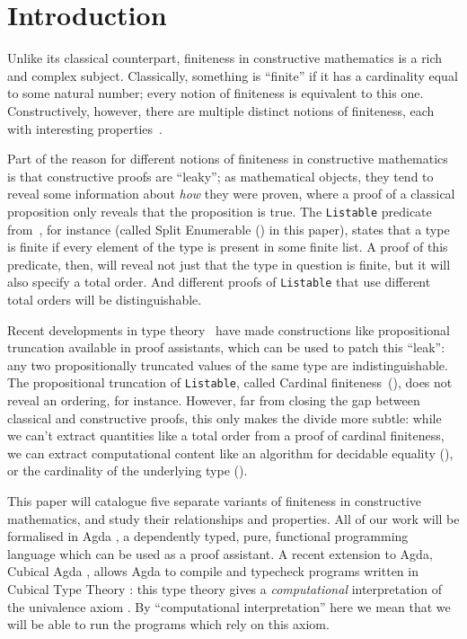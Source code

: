 \section{Introduction}
Unlike its classical counterpart, finiteness in constructive mathematics is a
rich and complex subject.
Classically, something is ``finite'' if it has a cardinality equal to some
natural number; every notion of finiteness is equivalent to this one.
Constructively, however, there are multiple distinct notions of finiteness, each
with interesting properties~\cite{coquandConstructivelyFinite2010,
  firsovVariationsNoetherianness2016, fruminFiniteSetsHomotopy2018}.

Part of the reason for different notions of finiteness in constructive
mathematics is that constructive proofs are ``leaky''; as mathematical
objects, they tend to reveal some information about \emph{how} they were proven,
where a proof of a classical proposition only reveals that the proposition is
true.
The \verb+Listable+ predicate
from~\citet{firsovDependentlyTypedProgramming2015}, for instance (called Split
Enumerable () in this paper),
states that a type is finite if every element of the type is present in some
finite list.
A proof of this predicate, then, will reveal not just that the type in question
is finite, but it will also specify a total order.
And different proofs of \verb+Listable+ that use different total orders will be
distinguishable.

Recent developments in type
theory~\cite[in particular Cubical Agda][]{vezzosiCubicalAgdaDependently2019}
have made constructions like propositional truncation available in proof
assistants, which
can be used to patch this ``leak'': any two propositionally truncated values of
the same type are indistinguishable.
The propositional truncation of \verb+Listable+, called Cardinal
finiteness~(), does not reveal an ordering, for instance.
However, far from closing the gap between classical and constructive proofs,
this only makes the divide more subtle: while we can't extract quantities like a
total order from a proof of cardinal finiteness, we can extract computational
content like an algorithm for decidable equality
(), or the cardinality of the underlying type
().

This paper will catalogue five separate variants of finiteness in constructive
mathematics, and study their relationships and properties.
All of our work will be formalised in Agda
\cite{norellDependentlyTypedProgramming2008}, a
dependently typed, pure, functional programming language which can be
used as a proof assistant.
A recent extension to Agda, Cubical Agda
\cite{vezzosiCubicalAgdaDependently2019}, allows Agda to compile and typecheck
programs written in Cubical Type Theory \cite{cohenCubicalTypeTheory2016}: this
type theory gives a \emph{computational} interpretation of the univalence axiom
\cite{hottbook}.
By ``computational interpretation'' here we mean that we will be able to run the
programs which rely on this axiom.

